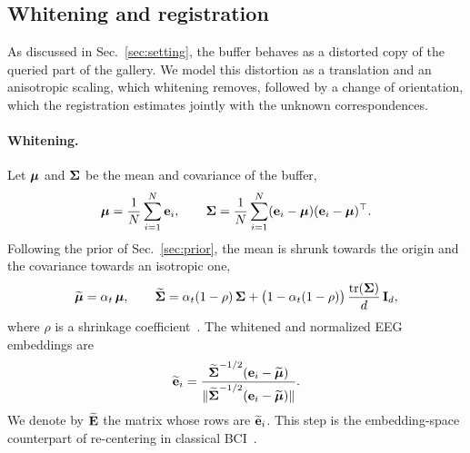 \subsection{Whitening and registration}
\label{sec:problem}


As discussed in Sec.~\ref{sec:setting}, the buffer behaves as a distorted copy of the queried
part of the gallery. We model this distortion as a translation and an
anisotropic scaling, which whitening removes, followed by a change of
orientation, which the registration estimates jointly with the unknown
correspondences.
\paragraph{Whitening.}
Let $\hbox{\boldmath$\mu$}$ and $\hbox{\boldmath$\Sigma$}$ be the mean and covariance of the buffer,
\begin{equation} \label{eq:moments}
\hbox{\boldmath$\mu$} = \frac{1}{N}\sum_{i=1}^{N} {\bf e}_i,
\qquad
\hbox{\boldmath$\Sigma$} = \frac{1}{N}\sum_{i=1}^{N}({\bf e}_i-\hbox{\boldmath$\mu$})({\bf e}_i-\hbox{\boldmath$\mu$})^\top .
\end{equation}
Following the prior of Sec.~\ref{sec:prior}, the mean is shrunk towards the origin and the covariance towards an isotropic one,
\begin{equation} \label{eq:shrunk}
\widetilde{\hbox{\boldmath$\mu$}} = \alpha_t\,\hbox{\boldmath$\mu$},
\qquad
\widetilde{\hbox{\boldmath$\Sigma$}} = \alpha_t(1-\rho)\,\hbox{\boldmath$\Sigma$} + \big(1-\alpha_t(1-\rho)\big)\,\frac{\operatorname{tr}(\hbox{\boldmath$\Sigma$})}{d}\, {\bf I}_d ,
\end{equation}
where $\rho$ is a shrinkage coefficient~\cite{ledoit2004honey}. The whitened and normalized EEG embeddings are
\begin{equation}\label{eq:whitening}
\widetilde{{\bf e}}_i = \frac{\widetilde{\hbox{\boldmath$\Sigma$}}^{-1/2}({\bf e}_i-\widetilde{\hbox{\boldmath$\mu$}})}{\|\widetilde{\hbox{\boldmath$\Sigma$}}^{-1/2}({\bf e}_i-\widetilde{\hbox{\boldmath$\mu$}})\|}.
\end{equation}
We denote by $\widetilde{{\bf E}}$ the matrix whose rows are $\widetilde{{\bf e}}_i$. This step is the embedding-space counterpart of re-centering in classical BCI~\cite{zanini2018transfer,he2020euclidean}.
